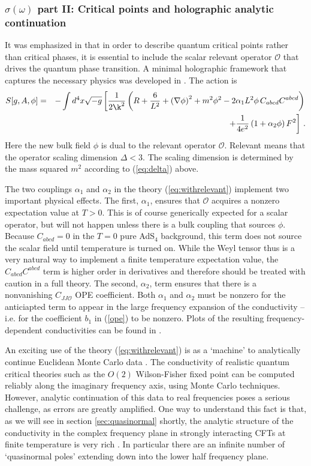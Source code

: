 \documentclass[10pt, oneside]{book}
\let\a=\alpha \let\b=\beta \let\g=\gamma \let\d=\delta \let\e=\varepsilon
\newcommand{\bea}{\begin{eqnarray}}
\newcommand{\eea}{\end{eqnarray}}
\def\ocal{{\mathcal{O}}}
\begin{document}
\begin{doublespace}
\subsubsection{$\sigma(\omega)$ part II: Critical points and holographic analytic continuation}

It was emphasized in \cite{Katz14} that in order to describe quantum critical points rather than critical phases, it is essential to include the scalar relevant operator $\ocal$ that drives the quantum phase transition. A minimal holographic framework that captures the necessary physics was developed in \cite{Myers:2016wsu}. The action is
\bea
S[g,A,\phi] & = & - \int d^4x \sqrt{-g} \left[\frac{1}{2 \k^2}\left( R + \frac{6}{L^2} + \left(\nabla \phi\right)^2 + m^2 \phi^2 - 2 \a_1 L^2 \phi \, C_{abcd} C^{abcd} \right) \right.  \nonumber \\
& & \qquad \qquad \qquad \qquad \qquad \left. + \frac{1}{4e^2} \left(1 + \alpha_2 \phi\right) F^2 \right] \,. \label{eq:withrelevant}
\eea
Here the new bulk field $\phi$ is dual to the relevant operator $\ocal$. Relevant means that the operator scaling dimension $\Delta < 3$. The scaling dimension is determined by the mass squared $m^2$ according to (\ref{eq:delta}) above.

The two couplings $\alpha_1$ and $\a_2$ in the theory (\ref{eq:withrelevant}) implement two important physical effects. The first, $\alpha_1$, ensures that $\ocal$ acquires a nonzero expectation value at $T>0$. This is of course generically expected for a scalar operator, but will not happen unless there is a bulk coupling that sources $\phi$. Because $C_{abcd} = 0$ in the $T=0$ pure AdS$_4$ background, this term does not source the scalar field until temperature is turned on. While the Weyl tensor thus is a very natural way to implement a finite temperature expectation value, the $C_{abcd} C^{abcd}$ term is higher order in derivatives and therefore should be treated with caution in a full theory. The second, $\alpha_2$, term ensures that there is a nonvanishing $C_{JJ\ocal}$ OPE coefficient. Both $\alpha_1$ and $\alpha_2$ must be nonzero for the anticiapted term to appear in the large frequency expansion of the conductivity -- i.e. for the coefficient $b_1$ in (\ref{ope}) to be nonzero. Plots of the resulting frequency-dependent conductivities can be found in \cite{Myers:2016wsu}.

An exciting use of the theory (\ref{eq:withrelevant}) is as a `machine' to analytically continue Euclidean Monte Carlo data \cite{Witczak-Krempa:2013nua, Katz14,Myers:2016wsu}. The conductivity of realistic quantum critical theories such as the $O(2)$ Wilson-Fisher fixed point can be computed reliably along the imaginary frequency axis, using Monte Carlo techniques. However, analytic continuation of this data to real frequencies poses a serious challenge, as errors are greatly amplified. One way to understand this fact is that, as we will see in section \ref{sec:quasinormal} shortly, the analytic structure of the conductivity in the complex frequency plane in strongly interacting CFTs at finite temperature is very rich \cite{WitczakKrempa:2012gn}. In particular there are an infinite number of `quasinormal poles' extending down into the lower half frequency plane.


\end{doublespace}
\end{document}

